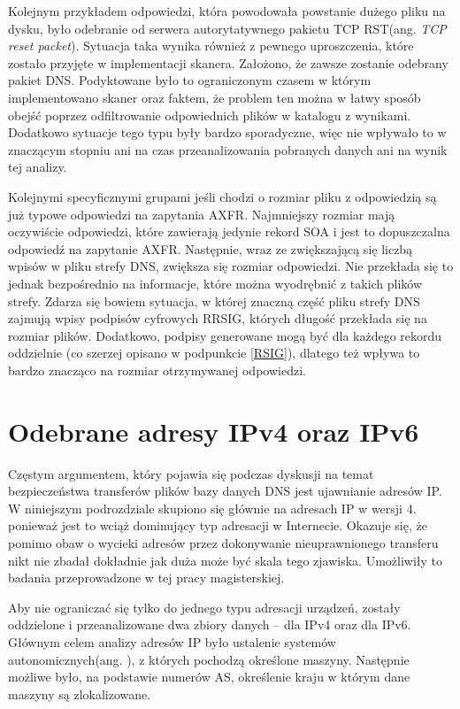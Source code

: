 Kolejnym przykładem odpowiedzi, która powodowała powstanie dużego pliku na dysku, było odebranie od serwera autorytatywnego pakietu TCP RST(ang. \textit{TCP reset packet}). Sytuacja taka wynika również z pewnego uproszczenia, które zostało przyjęte w implementacji skanera. Założono, że zawsze zostanie odebrany pakiet DNS. Podyktowane było to ograniczonym czasem w którym implementowano skaner oraz faktem, że problem ten można w łatwy sposób obejść poprzez odfiltrowanie odpowiednich plików w katalogu z wynikami. Dodatkowo sytuacje tego typu były bardzo sporadyczne, więc nie wpływało to w znaczącym stopniu ani na czas przeanalizowania pobranych danych ani na wynik tej analizy.

Kolejnymi specyficznymi grupami jeśli chodzi o rozmiar pliku z odpowiedzią są już typowe odpowiedzi na zapytania AXFR. Najmniejszy rozmiar mają oczywiście odpowiedzi, które zawierają jedynie rekord SOA i jest to dopuszczalna odpowiedź na zapytanie AXFR. Następnie, wraz ze zwiększającą się liczbą wpisów w pliku strefy DNS, zwiększa się rozmiar odpowiedzi. Nie przekłada się to jednak bezpośrednio na informacje, które można wyodrębnić z takich plików strefy. Zdarza się bowiem sytuacja, w której znaczną część pliku strefy DNS zajmują wpisy podpisów cyfrowych RRSIG, których długość przekłada się na rozmiar plików. Dodatkowo, podpisy generowane mogą być dla każdego rekordu oddzielnie (co szerzej opisano w podpunkcie \ref{RSIG}), dlatego też wpływa to bardzo znacząco na rozmiar otrzymywanej odpowiedzi.

\section{Odebrane adresy IPv4 oraz IPv6}
Częstym argumentem, który pojawia się podczas dyskusji na temat bezpieczeństwa transferów plików bazy danych DNS jest ujawnianie adresów IP. W niniejszym podrozdziale skupiono się głównie na adresach IP w wersji 4. ponieważ jest to wciąż dominujący typ adresacji w Internecie\cite{Ipv6_deployment}. Okazuje się, że pomimo obaw o wycieki adresów przez dokonywanie nieuprawnionego transferu nikt nie zbadał dokładnie jak duża może być skala tego zjawiska. Umożliwiły to badania przeprowadzone w tej pracy magisterskiej.

Aby nie ograniczać się tylko do jednego typu adresacji urządzeń, zostały oddzielone i przeanalizowane dwa zbiory danych -- dla IPv4 oraz dla IPv6. Głównym celem analizy adresów IP było ustalenie systemów autonomicznych(ang. ), z których pochodzą określone maszyny. Następnie możliwe było, na podstawie numerów AS, określenie kraju w którym dane maszyny są zlokalizowane. 

